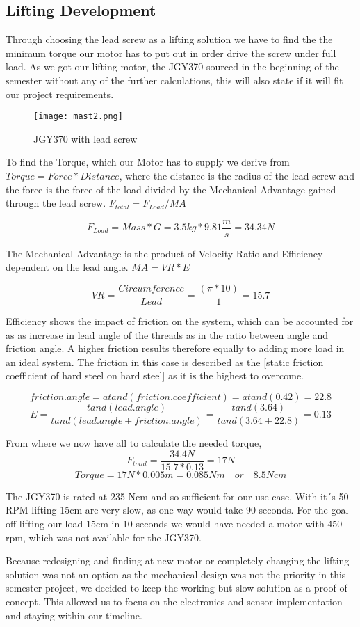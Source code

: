 \documentclass[../report.tex]{subfiles}
\begin{document}
\maketitle

\subsection{Lifting Development}
Through choosing the lead screw as a lifting solution we have to find the
the minimum torque our motor has to put out in order drive the screw under full load.
As we got our lifting motor, the JGY370 sourced in the beginning of the semester without 
any of the further calculations, this will also state if it will fit our project requirements.

\begin{wrapfigure}{r}{0.5\textwidth}
    \centering
    \texttt{[image: mast2.png]}
    \caption{JGY370 with lead screw}
\end{wrapfigure}
To find the Torque, which our Motor has to supply we derive from $Torque=Force*Distance$, where the 
distance is the radius of the lead screw and the force is the force of the load divided by the Mechanical 
Advantage gained through the lead screw. $F_{total}=F_{Load}/MA$

\[F_{Load}=Mass*G=3.5kg*9.81\frac{m}{s}=34.34N\]

The Mechanical Advantage is the product of Velocity Ratio and Efficiency dependent on the lead 
angle. $MA=VR*E$ 

\[VR=\frac{Circumference}{Lead}=\frac{(\pi*10)}{1}=15.7\]

Efficiency shows the impact of friction on the system, which can be accounted for as as increase in lead angle of the threads 
as in the ratio between angle and friction angle. A higher friction results therefore equally to adding more load in an ideal 
system. The friction in this case is described as the \cite{friction_coefficient}[static 
friction coefficient of hard steel on hard steel] as it is the highest to overcome. 

\[friction.angle=atand(friction.coefficient)= atand(0.42)=22.8\]
\[E=\frac{tand(lead.angle)}{tand(lead.angle+friction.angle)}=\frac{tand(3.64)}{tand(3.64+22.8)}=0.13\]

From where we now have all to calculate the needed torque, 
\[F_{total}=\frac{34.4N}{15.7*0.13}=17N\]
\[Torque=17N*0.005m=0.085Nm\quad or \quad 8.5Ncm\]

The JGY370 is rated at 235 Ncm and so sufficient for our use case. With it´s 50 RPM
lifting 15cm are very slow, as one way would take 90 seconds. For the goal off lifting 
our load 15cm in 10 seconds we would have needed a motor with 450 rpm, which was not 
available for the JGY370.

Because redesigning and finding at new motor 
or completely changing the lifting solution was not an option as the mechanical design 
was not the priority in this semester project, we decided to keep the working but slow 
solution as a proof of concept. This allowed us to focus on the electronics and sensor 
implementation and staying within our timeline.
\end{document}
